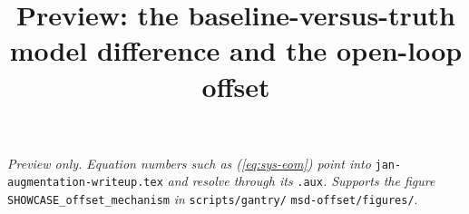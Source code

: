 \documentclass[11pt]{article}
\title{Preview: the baseline-versus-truth model difference and the open-loop offset}
\date{}
\begin{document}
\maketitle
\vspace{-10mm}

\begin{sloppypar}
\noindent\textit{Preview only. Equation numbers such as \textup{(\ref{eq:sys-eom})} point into}
\texttt{jan-augmentation-writeup.tex} \textit{and resolve through its} \texttt{.aux}\textit{.
Supports the figure} \texttt{SHOWCASE\_offset\_mechanism} \textit{in}
\texttt{scripts/gantry/} \texttt{msd-offset/figures/}.
\end{sloppypar}

\bigskip



\bigskip

\end{document}
